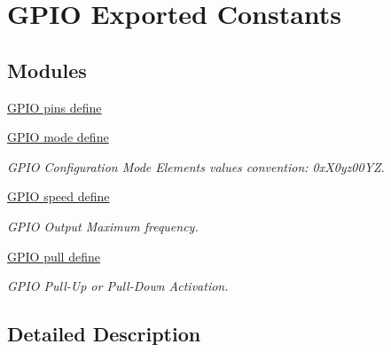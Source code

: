 \hypertarget{group___g_p_i_o___exported___constants}{}\section{G\+P\+IO Exported Constants}
\label{group___g_p_i_o___exported___constants}
\subsection*{Modules}
\begin{DoxyCompactItemize}
\item 
\hyperlink{group___g_p_i_o__pins__define}{G\+P\+I\+O pins define}
\item 
\hyperlink{group___g_p_i_o__mode__define}{G\+P\+I\+O mode define}
\begin{DoxyCompactList}\small\item\em G\+P\+IO Configuration Mode Elements values convention\+: 0x\+X0yz00\+YZ. \end{DoxyCompactList}\item 
\hyperlink{group___g_p_i_o__speed__define}{G\+P\+I\+O speed define}
\begin{DoxyCompactList}\small\item\em G\+P\+IO Output Maximum frequency. \end{DoxyCompactList}\item 
\hyperlink{group___g_p_i_o__pull__define}{G\+P\+I\+O pull define}
\begin{DoxyCompactList}\small\item\em G\+P\+IO Pull-\/\+Up or Pull-\/\+Down Activation. \end{DoxyCompactList}\end{DoxyCompactItemize}


\subsection{Detailed Description}

